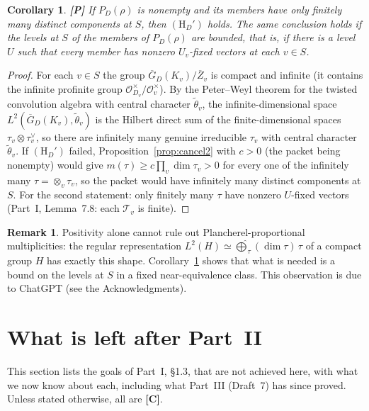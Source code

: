 \documentclass[12pt]{article}
\newcommand{\ov}[1]{\overline{#1}}
\newcommand{\cO}{\mathcal{O}}
\newcommand{\Zb}{\ov{Z}}
\newcommand{\GDb}{\ov{G}_D}
\newcommand{\Pv}{\textbf{[P]}}
\newcommand{\Cv}{\textbf{[C]}}
\theoremstyle{plain}
\newtheorem{corollary}[theorem]{Corollary}
\theoremstyle{definition}
\newtheorem{remark}[theorem]{Remark}
\begin{document}
\begin{corollary}\label{cor:finiteStypes}\Pv
If $P_D(\rho)$ is nonempty and its members have only finitely many distinct components at $S$, then $(\mathrm H_D')$ holds. The same conclusion holds if the levels at $S$ of the members of $P_D(\rho)$ are bounded, that is, if there is a level $U$ such that every member has nonzero $U_v$-fixed vectors at each $v\in S$.
\end{corollary}
\begin{proof}
For each $v\in S$ the group $\GDb(K_v)/\Zb_v$ is compact and infinite (it contains the infinite profinite group $\cO_{D_v}^\times/\cO_v^\times$). By the Peter--Weyl theorem for the twisted convolution algebra with central character $\tilde\theta_v$, the infinite-dimensional space $L^2(\GDb(K_v),\tilde\theta_v)$ is the Hilbert direct sum of the finite-dimensional spaces $\tau_v\otimes\tau_v^\vee$, so there are infinitely many genuine irreducible $\tau_v$ with central character $\tilde\theta_v$. If $(\mathrm H_D')$ failed, Proposition~\ref{prop:cancel2} with $c>0$ (the packet being nonempty) would give $m(\tau)\ge c\prod_v\dim\tau_v>0$ for every one of the infinitely many $\tau=\otimes_v\tau_v$, so the packet would have infinitely many distinct components at $S$. For the second statement: only finitely many $\tau$ have nonzero $U$-fixed vectors (Part~I, Lemma~7.8: each $\mathcal T_v$ is finite).
\end{proof}

\begin{remark}
Positivity alone cannot rule out Plancherel-proportional multiplicities: the regular representation $L^2(H)\simeq\widehat\bigoplus_\tau(\dim\tau)\,\tau$ of a compact group $H$ has exactly this shape. Corollary~\ref{cor:finiteStypes} shows that what is needed is a bound on the levels at $S$ in a fixed near-equivalence class. This observation is due to ChatGPT (see the Acknowledgments).
\end{remark}

\section{What is left after Part~II}\label{sec:partIII}
This section lists the goals of Part~I, \S1.3, that are not achieved here, with what we now know about each, including what Part~III (Draft~7) has since proved. Unless stated otherwise, all are \Cv.
\end{document}
